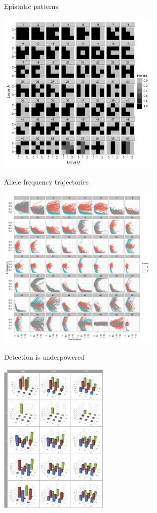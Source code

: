 \documentclass{beamer}
\begin{document}
\begin{frame}{Epistatic patterns}
	\begin{center}
		\includegraphics[width=8cm]{sup_gpmaps.pdf}
	\end{center}
\end{frame}

\begin{frame}{Allele frequency trajectories}
	\begin{center}
		\includegraphics[width=8cm]{sup_allelefreq_sim.png}
	\end{center}
\end{frame}

\begin{frame}{Detection is underpowered}
	\begin{center}
		\includegraphics[height=7.5cm]{gpmaps_ld.png}
	\end{center}
\end{frame}
\end{document}
